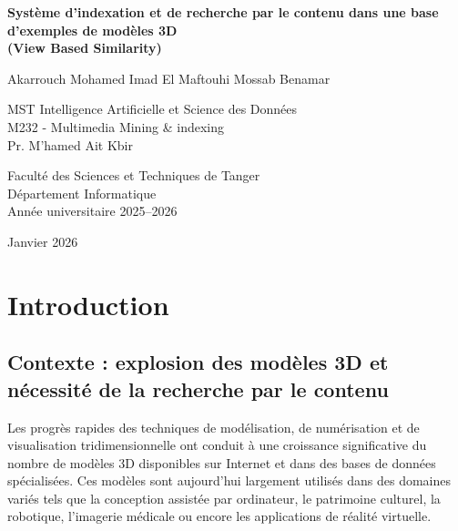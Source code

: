 \documentclass[11pt,a4paper,oneside]{report}
\begin{document}
\begin{titlepage}
\centering
\vspace*{2cm}

{\LARGE\bfseries Système d’indexation et de recherche par le contenu dans une base d’exemples de modèles 3D \\ (View Based Similarity)\par}

\vfill

{\large Akarrouch Mohamed \quad Imad El Maftouhi \quad Mossab Benamar\par}

\vfill

{\large MST Intelligence Artificielle et Science des Données \\ M232 - Multimedia Mining \& indexing \\ Pr. M'hamed Ait Kbir\par}

\vfill

Faculté des Sciences et Techniques de Tanger \\
Département Informatique \\
Année universitaire 2025--2026

\vfill

{\large Janvier 2026 \par}

\end{titlepage}

\tableofcontents
\newpage


\chapter{Introduction}

\section{Contexte : explosion des modèles 3D et nécessité de la recherche par le contenu}

Les progrès rapides des techniques de modélisation, de numérisation et de visualisation tridimensionnelle ont conduit à une croissance significative du nombre de modèles 3D disponibles sur Internet et dans des bases de données spécialisées. Ces modèles sont aujourd’hui largement utilisés dans des domaines variés tels que la conception assistée par ordinateur, le patrimoine culturel, la robotique, l’imagerie médicale ou encore les applications de réalité virtuelle.
\end{document}
